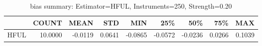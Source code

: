 \begin{table}[ht]
\centering
\caption{bias summary: Estimator=HFUL, Instruments=250, Strength=0.20}
\begin{tabular}{lrrrrrrrr}
\toprule
 & COUNT & MEAN & STD & MIN & 25\% & 50\% & 75\% & MAX \\
\midrule
HFUL & 10.0000 & -0.0119 & 0.0641 & -0.0865 & -0.0572 & -0.0236 & 0.0266 & 0.1039 \\
\bottomrule
\end{tabular}
\end{table}
